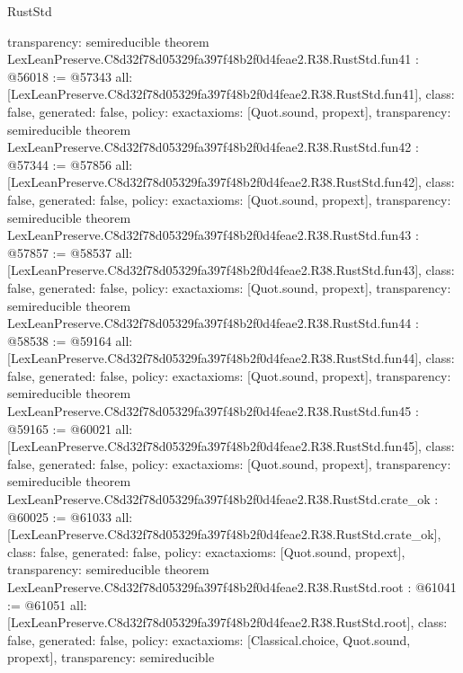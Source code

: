 \begin{lexlean}{RustStd}
\begin{coremodule}
{  transparency: semireducible
}
theorem LexLeanPreserve.C8d32f78d05329fa397f48b2f0d4feae2.R38.RustStd.fun41 : @56018 := @57343 {
  all: [LexLeanPreserve.C8d32f78d05329fa397f48b2f0d4feae2.R38.RustStd.fun41],
  class: false,
  generated: false,
  policy: exact{axioms: [Quot.sound, propext]},
  transparency: semireducible
}
theorem LexLeanPreserve.C8d32f78d05329fa397f48b2f0d4feae2.R38.RustStd.fun42 : @57344 := @57856 {
  all: [LexLeanPreserve.C8d32f78d05329fa397f48b2f0d4feae2.R38.RustStd.fun42],
  class: false,
  generated: false,
  policy: exact{axioms: [Quot.sound, propext]},
  transparency: semireducible
}
theorem LexLeanPreserve.C8d32f78d05329fa397f48b2f0d4feae2.R38.RustStd.fun43 : @57857 := @58537 {
  all: [LexLeanPreserve.C8d32f78d05329fa397f48b2f0d4feae2.R38.RustStd.fun43],
  class: false,
  generated: false,
  policy: exact{axioms: [Quot.sound, propext]},
  transparency: semireducible
}
theorem LexLeanPreserve.C8d32f78d05329fa397f48b2f0d4feae2.R38.RustStd.fun44 : @58538 := @59164 {
  all: [LexLeanPreserve.C8d32f78d05329fa397f48b2f0d4feae2.R38.RustStd.fun44],
  class: false,
  generated: false,
  policy: exact{axioms: [Quot.sound, propext]},
  transparency: semireducible
}
theorem LexLeanPreserve.C8d32f78d05329fa397f48b2f0d4feae2.R38.RustStd.fun45 : @59165 := @60021 {
  all: [LexLeanPreserve.C8d32f78d05329fa397f48b2f0d4feae2.R38.RustStd.fun45],
  class: false,
  generated: false,
  policy: exact{axioms: [Quot.sound, propext]},
  transparency: semireducible
}
theorem LexLeanPreserve.C8d32f78d05329fa397f48b2f0d4feae2.R38.RustStd.crate_ok : @60025 := @61033 {
  all: [LexLeanPreserve.C8d32f78d05329fa397f48b2f0d4feae2.R38.RustStd.crate_ok],
  class: false,
  generated: false,
  policy: exact{axioms: [Quot.sound, propext]},
  transparency: semireducible
}
theorem LexLeanPreserve.C8d32f78d05329fa397f48b2f0d4feae2.R38.RustStd.root : @61041 := @61051 {
  all: [LexLeanPreserve.C8d32f78d05329fa397f48b2f0d4feae2.R38.RustStd.root],
  class: false,
  generated: false,
  policy: exact{axioms: [Classical.choice, Quot.sound, propext]},
  transparency: semireducible
}


\end{coremodule}
\end{lexlean}

